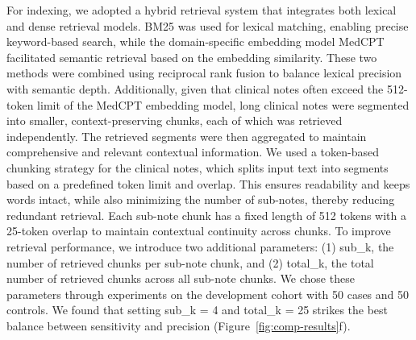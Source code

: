 \documentclass[fleqn,10pt]{wlscirep}
\begin{document}
For indexing, we adopted a hybrid retrieval system that integrates both lexical and dense retrieval models. BM25 was used for lexical matching,\cite{robertson2009probabilistic} enabling precise keyword-based search, while the domain-specific embedding model MedCPT\cite{jin2023medcpt} facilitated semantic retrieval based on the embedding similarity. These two methods were combined using reciprocal rank fusion to balance lexical precision with semantic depth.\cite{cormack2009reciprocal} Additionally, given that clinical notes often exceed the 512-token limit of the MedCPT embedding model, long clinical notes were segmented into smaller, context-preserving chunks, each of which was retrieved independently. The retrieved segments were then aggregated to maintain comprehensive and relevant contextual information. We used a token-based chunking strategy for the clinical notes, which splits input text into segments based on a predefined token limit and overlap. This ensures readability and keeps words intact, while also minimizing the number of sub-notes, thereby reducing redundant retrieval. Each sub-note chunk has a fixed length of 512 tokens with a 25-token overlap to maintain contextual continuity across chunks. To improve retrieval performance, we introduce two additional parameters: (1) sub\_k, the number of retrieved chunks per sub-note chunk, and (2) total\_k, the total number of retrieved chunks across all sub-note chunks. We chose these parameters through experiments on the development cohort with 50 cases and 50 controls. We found that setting sub\_k = 4 and total\_k = 25 strikes the best balance between sensitivity and precision (Figure~\ref{fig:comp-results}f).


\end{document}

